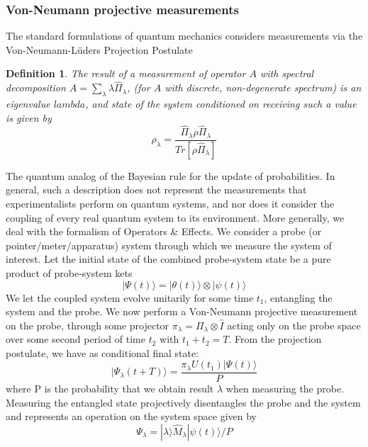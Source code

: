 \subsubsection{Von-Neumann projective measurements}
The standard formulations of quantum mechanics considers measurements via the Von-Neumann-L\"uders Projection Postulate\cite{Dirac1927}
\newtheorem{definition}{Definition}
\begin{definition}
    The result of a measurement of operator $A$ with spectral decomposition $A = \sum_\lambda \lambda \hat{\Pi}_\lambda $, (for $A$ with discrete, non-degenerate spectrum) is an eigenvalue $lambda$, and state of the system conditioned on receiving such a value is given by
    \begin{equation}
        \rho_\lambda = \frac{\hat{\Pi}_\lambda \rho \hat{\Pi}_\lambda}{Tr[\rho\hat{\Pi}_\lambda]}
    \end{equation}
\end{definition}
The quantum analog of the Bayesian rule for the update of probabilities.
In general, such a description does not represent the measurements that experimentalists perform on quantum systems, and nor does it consider the coupling of every real quantum system to its environment.
More generally, we deal with the formalism of Operators \& Effects.
We consider a probe (or pointer/meter/apparatus) system through which we measure the system of interest.
Let the initial state of the combined probe-system state be a pure product of probe-system kets
\begin{equation}
  | \Psi (t) \rangle = | \theta (t) \rangle \otimes | \psi (t) \rangle
\end{equation}
We let the coupled system evolve unitarily for some time $t_1$, entangling the system and the probe.
We now perform a Von-Neumann projective measurement on the probe, through some projector $\pi_\lambda = \Pi_\lambda \otimes \hat{I}$ acting only on the probe space over some second period of time $t_2$ with $t_1 + t_2 = T$.
From the projection postulate, we have as conditional final state:
\begin{equation}
    | \Psi_\lambda (t+T) \rangle = \frac{\pi_\lambda U(t_1) |\Psi(t)\rangle}{P}
\end{equation}
where P is the probability that we obtain result $\lambda$ when measuring the probe.
Measuring the entangled state projectively disentangles the probe and the system and represents an operation on the system space given by
\begin{equation}
\Psi_\lambda = | \lambda \rangle \hat{M}_\lambda | \psi(t) \rangle / P
\end{equation}
